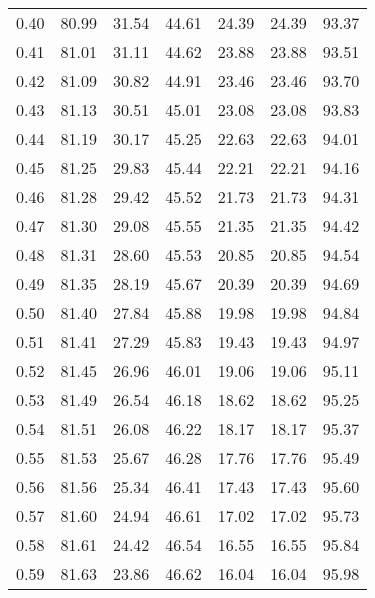 \begin{tabular}{|c|c|c|c|c|c|c|}
      0.40 &     80.99 &     31.54 &      44.61 &   24.39 &      24.39 &         93.37 \\
      0.41 &     81.01 &     31.11 &      44.62 &   23.88 &      23.88 &         93.51 \\
      0.42 &     81.09 &     30.82 &      44.91 &   23.46 &      23.46 &         93.70 \\
      0.43 &     81.13 &     30.51 &      45.01 &   23.08 &      23.08 &         93.83 \\
      0.44 &     81.19 &     30.17 &      45.25 &   22.63 &      22.63 &         94.01 \\
      0.45 &     81.25 &     29.83 &      45.44 &   22.21 &      22.21 &         94.16 \\
      0.46 &     81.28 &     29.42 &      45.52 &   21.73 &      21.73 &         94.31 \\
      0.47 &     81.30 &     29.08 &      45.55 &   21.35 &      21.35 &         94.42 \\
      0.48 &     81.31 &     28.60 &      45.53 &   20.85 &      20.85 &         94.54 \\
      0.49 &     81.35 &     28.19 &      45.67 &   20.39 &      20.39 &         94.69 \\
      0.50 &     81.40 &     27.84 &      45.88 &   19.98 &      19.98 &         94.84 \\
      0.51 &     81.41 &     27.29 &      45.83 &   19.43 &      19.43 &         94.97 \\
      0.52 &     81.45 &     26.96 &      46.01 &   19.06 &      19.06 &         95.11 \\
      0.53 &     81.49 &     26.54 &      46.18 &   18.62 &      18.62 &         95.25 \\
      0.54 &     81.51 &     26.08 &      46.22 &   18.17 &      18.17 &         95.37 \\
      0.55 &     81.53 &     25.67 &      46.28 &   17.76 &      17.76 &         95.49 \\
      0.56 &     81.56 &     25.34 &      46.41 &   17.43 &      17.43 &         95.60 \\
      0.57 &     81.60 &     24.94 &      46.61 &   17.02 &      17.02 &         95.73 \\
      0.58 &     81.61 &     24.42 &      46.54 &   16.55 &      16.55 &         95.84 \\
      0.59 &     81.63 &     23.86 &      46.62 &   16.04 &      16.04 &         95.98 \\

\end{tabular}
